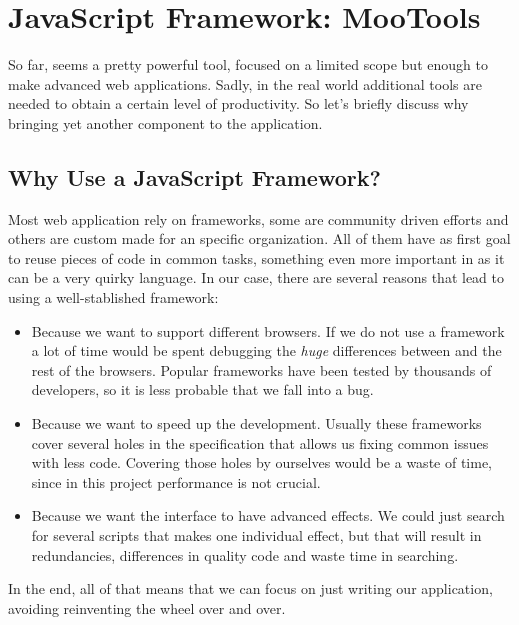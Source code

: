 \section{JavaScript Framework: MooTools} %
\label{sec:mootools}

So far,  seems a pretty powerful tool, focused on a limited scope but enough to make advanced web applications.
Sadly, in the real world additional tools are needed to obtain a certain level of productivity.
So let's briefly discuss why bringing yet another component to the application.

\subsection{Why Use a JavaScript Framework?} %
\label{sub:whymootools}

Most web application rely on  frameworks, some are community driven efforts and others are custom made for an specific organization.
All of them have as first goal to reuse pieces of code in common tasks, something even more important in  as it can be a very quirky language.
In our case, there are several reasons that lead to using a well-stablished framework:

\begin{itemize}
  \item Because we want to support different browsers.
  If we do not use a framework a lot of time would be spent debugging the \emph{huge} differences between  and the rest of the browsers.
  Popular frameworks have been tested by thousands of developers, so it is less probable that we fall into a bug.
  \item Because we want to speed up the development.
  Usually these frameworks cover several holes in the  specification that allows us fixing common issues with less code.
  Covering those holes by ourselves would be a waste of time, since in this project performance is not crucial.
  \item Because we want the interface to have advanced effects.
  We could just search for several scripts that makes one individual effect, but that will result in redundancies, differences in quality code and waste time in searching.
\end{itemize}

In the end, all of that means that we can focus on just writing our application, avoiding reinventing the wheel over and over.

